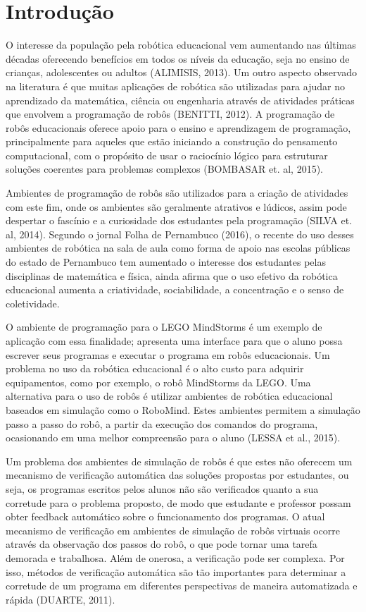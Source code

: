 \chapter{Introdução}

O interesse da população pela robótica educacional vem aumentando nas últimas
décadas oferecendo benefícios em todos os níveis da educação, seja no ensino de crianças, adolescentes ou adultos (ALIMISIS, 2013). Um outro aspecto observado na literatura é que muitas aplicações de robótica são utilizadas para ajudar no aprendizado da matemática, ciência ou engenharia através de atividades práticas que envolvem a programação de robôs (BENITTI, 2012). A programação de robôs educacionais oferece apoio para o ensino e aprendizagem de programação, principalmente para aqueles que estão iniciando a construção do pensamento computacional, com o propósito de usar o raciocínio lógico para estruturar soluções coerentes para problemas complexos (BOMBASAR et. al, 2015).

Ambientes de programação de robôs são utilizados para a criação de atividades com
este fim, onde os ambientes são geralmente atrativos e lúdicos, assim pode despertar o fascínio e a curiosidade dos estudantes pela programação (SILVA et. al, 2014). Segundo o jornal Folha de Pernambuco (2016), o recente do uso desses ambientes de robótica na sala de aula como forma de apoio nas escolas públicas do estado de Pernambuco tem aumentado o interesse dos estudantes pelas disciplinas de matemática e física, ainda afirma que o uso efetivo da robótica educacional aumenta a criatividade, sociabilidade, a concentração e o senso de coletividade.

O ambiente de programação para o LEGO MindStorms é um exemplo de aplicação
com essa finalidade; apresenta uma interface para que o aluno possa escrever seus
programas e executar o programa em robôs educacionais. Um problema no uso da robótica educacional é o alto custo para adquirir equipamentos, como por exemplo, o robô MindStorms da LEGO. Uma alternativa para o uso de robôs é utilizar ambientes de robótica educacional baseados em simulação como o RoboMind. Estes ambientes permitem a simulação passo a passo do robô, a partir da execução dos comandos do programa,
ocasionando em uma melhor compreensão para o aluno (LESSA et al., 2015).

Um problema dos ambientes de simulação de robôs é que estes não oferecem um
mecanismo de verificação automática das soluções propostas por estudantes, ou seja, os programas escritos pelos alunos não são verificados quanto a sua corretude para o problema proposto, de modo que estudante e professor possam obter feedback automático sobre o funcionamento dos programas. O atual mecanismo de verificação em ambientes de simulação de robôs virtuais ocorre através da observação dos passos do robô, o que pode tornar uma tarefa demorada e trabalhosa. Além de onerosa, a verificação pode ser complexa. Por isso, métodos de verificação automática são tão importantes para determinar a corretude de um programa em diferentes perspectivas de maneira automatizada e rápida (DUARTE, 2011). 


